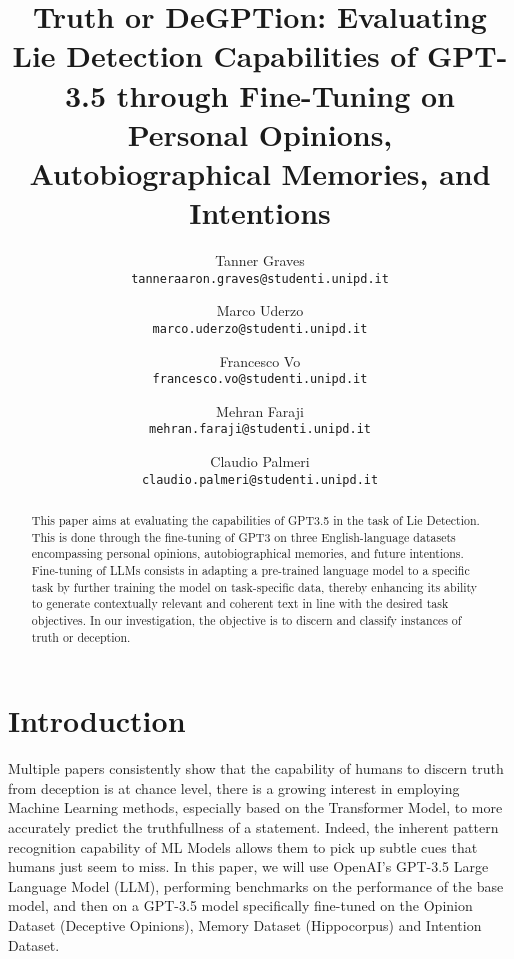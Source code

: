 \documentclass[10pt,twocolumn,letterpaper]{article}
\begin{document}
\title{Truth or DeGPTion: Evaluating Lie Detection Capabilities of GPT-3.5 through Fine-Tuning on Personal Opinions, Autobiographical Memories, and Intentions}


\author{
Tanner Graves\\
{\tt\small tanneraaron.graves@studenti.unipd.it}
\and
Marco Uderzo\\
{\tt\small marco.uderzo@studenti.unipd.it}
\and
Francesco Vo \\
{\tt\small francesco.vo@studenti.unipd.it}
\and
Mehran Faraji\\
{\tt\small mehran.faraji@studenti.unipd.it}
\and
Claudio Palmeri \\
{\tt\small claudio.palmeri@studenti.unipd.it}
}

\maketitle


\begin{abstract}
This paper aims at evaluating the capabilities of GPT3.5 in the task of Lie Detection.
This is done through the fine-tuning of GPT3 on three English-language datasets encompassing 
personal opinions, autobiographical memories, and future intentions. 
Fine-tuning of LLMs consists in adapting a pre-trained language model to a specific 
task by further training the model on task-specific data, thereby 
enhancing its ability to generate contextually relevant and coherent text in 
line with the desired task objectives. In our investigation, the objective is to 
discern and classify instances of truth or deception.

\end{abstract}

\section{Introduction}
Multiple papers consistently show that the capability of humans to discern truth from deception
is at chance level, there is a growing interest in employing Machine Learning methods, especially
based on the Transformer Model, to more accurately predict the truthfullness of a statement.
Indeed, the inherent pattern recognition capability of ML Models allows them to pick up subtle cues
that humans just seem to miss. In this paper, we will use OpenAI's GPT-3.5 Large Language Model (LLM),
performing benchmarks on the performance of the base model, and then on a GPT-3.5 model specifically
fine-tuned on the Opinion Dataset (Deceptive Opinions), Memory Dataset (Hippocorpus) and Intention Dataset.
\end{document}

